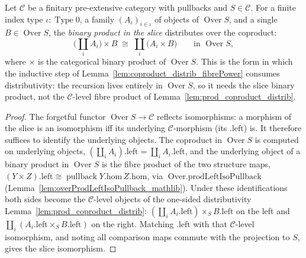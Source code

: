 \begin{lemma}
  \label{lem:overProd_coproduct_distrib}
  Let \(\mathcal{C}\) be a finitary pre-extensive category with pullbacks and \(S \in \mathcal{C}\).
  For a finite index type \(\iota : \operatorname{Type} 0\), a family \((A_i)_{i \in \iota}\) of
  objects of \(\operatorname{Over} S\), and a single \(B \in \operatorname{Over} S\), the
  \emph{binary product in the slice} distributes over the coproduct:
  \[
    \bigl(\textstyle\coprod_{i} A_i\bigr) \times B
      \;\cong\;
    \coprod_{i} \bigl(A_i \times B\bigr)
      \qquad\text{in } \operatorname{Over} S,
  \]
  where \(\times\) is the categorical binary product of \(\operatorname{Over} S\). This is the form in
  which the inductive step of Lemma~\ref{lem:coproduct_distrib_fibrePower} consumes distributivity:
  the recursion lives entirely in \(\operatorname{Over} S\), so it needs the slice binary product, not
  the \(\mathcal{C}\)-level fibre product of Lemma~\ref{lem:prod_coproduct_distrib}.
\end{lemma}
\begin{proof}
  The forgetful functor \(\operatorname{Over} S \to \mathcal{C}\) reflects isomorphisms: a morphism of
  the slice is an isomorphism iff its underlying \(\mathcal{C}\)-morphism (its \(.\mathrm{left}\)) is.
  It therefore suffices to identify the underlying objects. The coproduct in \(\operatorname{Over} S\)
  is computed on underlying objects, \((\coprod_i A_i).\mathrm{left} = \coprod_i A_i.\mathrm{left}\),
  and the underlying object of a binary product in \(\operatorname{Over} S\) is the fibre product of
  the two structure maps, \((Y \times Z).\mathrm{left} \cong \operatorname{pullback} Y.\mathrm{hom}\,
  Z.\mathrm{hom}\), via \(\operatorname{Over.prodLeftIsoPullback}\)
  (Lemma~\ref{lem:overProdLeftIsoPullback_mathlib}). Under these identifications both sides become
  the \(\mathcal{C}\)-level objects of the one-sided distributivity
  Lemma~\ref{lem:prod_coproduct_distrib}: \((\coprod_i A_i.\mathrm{left}) \times_S B.\mathrm{left}\)
  on the left and \(\coprod_i (A_i.\mathrm{left} \times_S B.\mathrm{left})\) on the right. Matching
  \(.\mathrm{left}\) with that \(\mathcal{C}\)-level isomorphism, and noting all comparison maps commute
  with the projection to \(S\), gives the slice isomorphism.
\end{proof}

